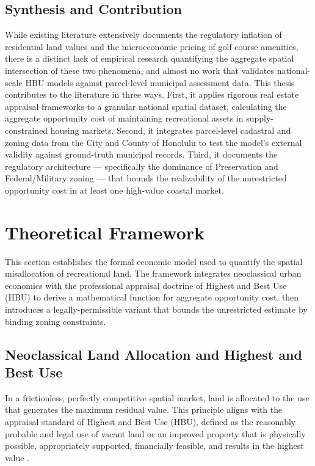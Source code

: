\documentclass[11pt, letterpaper]{article}
\begin{document}
\subsection{Synthesis and Contribution}

While existing literature extensively documents the regulatory inflation of residential land values and the microeconomic pricing of golf course amenities, there is a distinct lack of empirical research quantifying the aggregate spatial intersection of these two phenomena, and almost no work that validates national-scale HBU models against parcel-level municipal assessment data. This thesis contributes to the literature in three ways. First, it applies rigorous real estate appraisal frameworks \parencite{AppraisalInstitute2020} to a granular national spatial dataset, calculating the aggregate opportunity cost of maintaining recreational assets in supply-constrained housing markets. Second, it integrates parcel-level cadastral and zoning data from the City and County of Honolulu to test the model's external validity against ground-truth municipal records. Third, it documents the regulatory architecture --- specifically the dominance of Preservation and Federal/Military zoning --- that bounds the realizability of the unrestricted opportunity cost in at least one high-value coastal market.

\newpage

\section{Theoretical Framework}

This section establishes the formal economic model used to quantify the spatial misallocation of recreational land. The framework integrates neoclassical urban economics with the professional appraisal doctrine of Highest and Best Use (HBU) to derive a mathematical function for aggregate opportunity cost, then introduces a legally-permissible variant that bounds the unrestricted estimate by binding zoning constraints.

\subsection{Neoclassical Land Allocation and Highest and Best Use}

In a frictionless, perfectly competitive spatial market, land is allocated to the use that generates the maximum residual value. This principle aligns with the appraisal standard of Highest and Best Use (HBU), defined as the reasonably probable and legal use of vacant land or an improved property that is physically possible, appropriately supported, financially feasible, and results in the highest value \parencite{AppraisalInstitute2020}.
\end{document}
